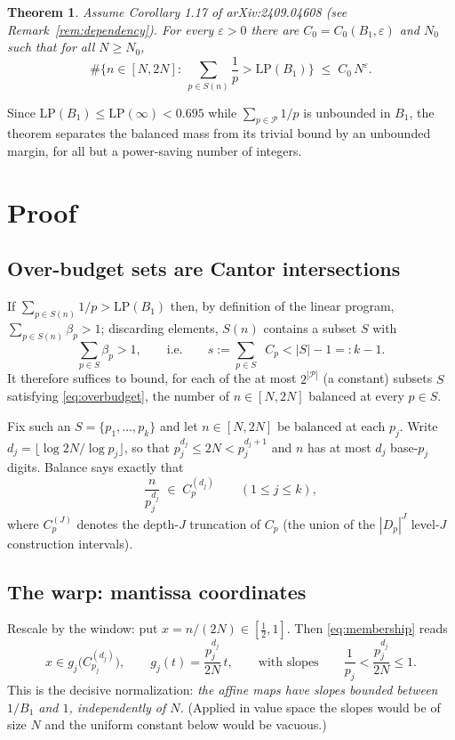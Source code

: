 \documentclass[11pt]{article}
\newtheorem{theorem}{Theorem}
\DeclareMathOperator{\dimH}{dim_H}
\begin{document}
\begin{theorem}\label{thm:core}
Assume Corollary 1.17 of arXiv:2409.04608 \emph{(see Remark~\ref{rem:dependency})}.
For every $\varepsilon>0$ there are $C_0=C_0(B_1,\varepsilon)$ and $N_0$ such that for all
$N\ge N_0$,
\[
\#\Big\{n\in[N,2N]:\ \sum_{p\in S(n)}\frac1p>\mathrm{LP}(B_1)\Big\}\;\le\;C_0\,N^{\varepsilon}.
\]
\end{theorem}

Since $\mathrm{LP}(B_1)\le\mathrm{LP}(\infty)<0.695$ while $\sum_{p\in\mathcal P}1/p$ is
unbounded in $B_1$, the theorem separates the balanced mass from its trivial bound by an
unbounded margin, for all but a power-saving number of integers.

\section{Proof}

\subsection{Over-budget sets are Cantor intersections}
If $\sum_{p\in S(n)}1/p>\mathrm{LP}(B_1)$ then, by definition of the linear program,
$\sum_{p\in S(n)}\beta_p>1$; discarding elements, $S(n)$ contains a subset $S$ with
\begin{equation}\label{eq:overbudget}
\sum_{p\in S}\beta_p>1,\qquad\text{i.e.}\qquad
s:=\sum_{p\in S}\dimH C_p<|S|-1=:k-1 .
\end{equation}
It therefore suffices to bound, for each of the at most $2^{|\mathcal P|}$ (a constant)
subsets $S$ satisfying \eqref{eq:overbudget}, the number of $n\in[N,2N]$ balanced at every
$p\in S$.

Fix such an $S=\{p_1,\dots,p_k\}$ and let $n\in[N,2N]$ be balanced at each $p_j$.  Write
$d_j=\lfloor\log 2N/\log p_j\rfloor$, so that $p_j^{d_j}\le 2N<p_j^{d_j+1}$ and $n$ has at
most $d_j$ base-$p_j$ digits.  Balance says exactly that
\begin{equation}\label{eq:membership}
\frac{n}{p_j^{d_j}}\;\in\;C_p^{(d_j)}\qquad(1\le j\le k),
\end{equation}
where $C_p^{(J)}$ denotes the depth-$J$ truncation of $C_p$ (the union of the $|D_p|^J$
level-$J$ construction intervals).

\subsection{The warp: mantissa coordinates}\label{sec:warp}
Rescale by the window: put $x=n/(2N)\in[\tfrac12,1]$.  Then \eqref{eq:membership} reads
\[
x\in g_j\big(C_{p_j}^{(d_j)}\big),\qquad
g_j(t)=\frac{p_j^{d_j}}{2N}\,t,
\qquad\text{with slopes}\qquad
\frac{1}{p_j}<\frac{p_j^{d_j}}{2N}\le 1 .
\]
This is the decisive normalization: \emph{the affine maps have slopes bounded between
$1/B_1$ and $1$, independently of $N$.}  (Applied in value space the slopes would be of
size $N$ and the uniform constant below would be vacuous.)
\end{document}
